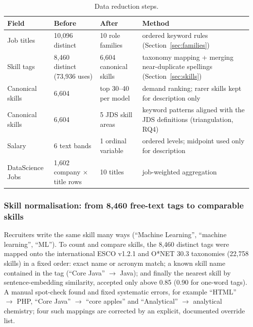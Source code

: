 \begin{table}[H]\centering\small
\caption{Data reduction steps.}\label{tab:reduction}
\begin{tabularx}{\linewidth}{@{}L{3.2cm}L{2.7cm}L{2.7cm}Y@{}}
\toprule
Field & Before & After & Method\\
\midrule
Job titles & 10,096 distinct & 10 role families & ordered keyword rules (Section~\ref{sec:families})\\
Skill tags & 8,460 distinct (73,936 uses) & 6,604 canonical skills & taxonomy mapping + merging near-duplicate spellings (Section~\ref{sec:skills})\\
Canonical skills & 6,604 & top 30--40 per model & demand ranking; rarer skills kept for description only\\
Canonical skills & 6,604 & 5 JDS skill areas & keyword patterns aligned with the JDS definitions (triangulation, RQ4)\\
Salary & 6 text bands & 1 ordinal variable & ordered levels; midpoint used only for description\\
DataScience Jobs & 1,602 company $\times$ title rows & 10 titles & job-weighted aggregation\\
\bottomrule
\end{tabularx}
\end{table}

\subsubsection*{Skill normalisation: from 8,460 free-text tags to comparable skills}\label{sec:skills}

Recruiters write the same skill many ways (``Machine Learning'', ``machine learning'', ``ML''). To
count and compare skills, the 8,460 distinct tags were mapped onto the international ESCO v1.2.1
and O*NET 30.3 taxonomies (22,758 skills) in a fixed order: exact name or acronym match;
a known skill name contained in the tag (``Core Java'' $\rightarrow$ Java); and finally the nearest
skill by sentence-embedding similarity, accepted only above 0.85 (0.90 for one-word tags). A manual
spot-check found and fixed systematic errors, for example ``HTML'' $\rightarrow$ PHP, ``Core Java''
$\rightarrow$ ``core apples'' and ``Analytical'' $\rightarrow$ analytical chemistry; four such
mappings are corrected by an explicit, documented override list.


